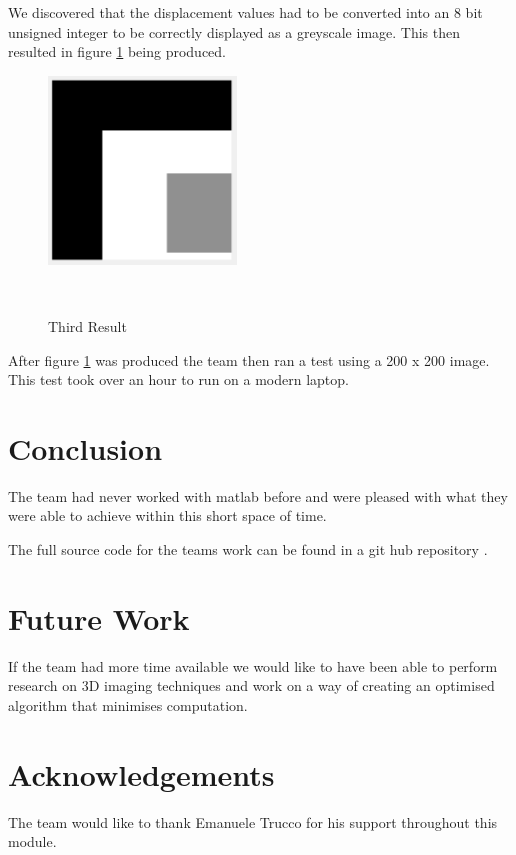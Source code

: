 \documentclass[twocolumn]{article}
\begin{document}
We discovered that the displacement values had to be converted into an 8 bit unsigned integer to be correctly displayed as a greyscale image. This then resulted in figure \ref{fig:Third_Result} being produced. 

\begin{figure}[H]
\centering
  \includegraphics[height=50mm]{Figures/Third_Result}
    \caption{Third Result}~\label{fig:Third_Result}
\end{figure} 

After figure \ref{fig:Third_Result} was produced the team then ran a test using a 200 x 200 image. This test took over an hour to run on a modern laptop.  




\section{Conclusion}
\vspace{-1ex}

The team had never worked with matlab before and were pleased with what they were able to achieve within this short space of time.
 

The full source code for the teams work can be found in a git hub repository \cite{githublink}.

\section{Future Work} 
\vspace{-1ex}

If the team had more time available we would like to have been able to perform research on 3D imaging techniques and work on a way of creating an optimised algorithm that minimises computation. 


\section*{Acknowledgements}
The team would like to thank Emanuele Trucco for his support throughout this module. 





\end{document}
